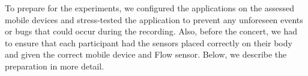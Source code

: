 \begin{table}
\begin{center}
\caption{Device models used during the concert.}
\end{center}
\end{table}

To prepare for the experiments, we configured the applications on the assessed mobile devices and stress-tested the application to prevent any unforeseen events or bugs that could occur during the recording. Also, before the concert, we had to ensure that each participant had the sensors placed correctly on their body and given the correct mobile device and Flow sensor. Below, we describe the preparation in more detail.


